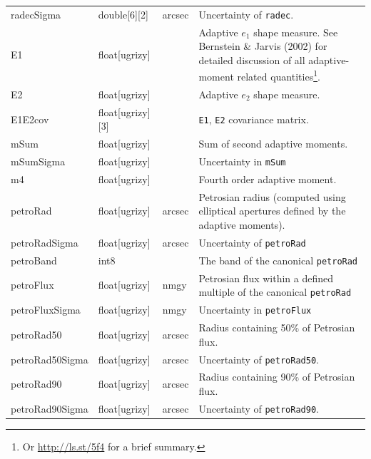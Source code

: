 \documentclass[12pt]{article}
\begin{document}
\begin{center}
\begin{longtable}{p{3cm}p{2cm}p{2cm}p{5cm}}
radecSigma & double[6][2] & arcsec & Uncertainty of {\tt radec}. \\


E1 & float[ugrizy] & ~ & Adaptive $e_1$ shape measure. See Bernstein \& Jarvis (2002) for detailed discussion of all adaptive-moment related quantities\footnote{Or \url{http://ls.st/5f4} for a brief summary.}. \\

E2 & float[ugrizy] & ~ & Adaptive $e_2$ shape measure. \\

E1E2cov & float[ugrizy][3] & ~ & {\tt E1}, {\tt E2} covariance matrix. \\

mSum & float[ugrizy] & ~ & Sum of second adaptive moments. \\

mSumSigma & float[ugrizy] & ~ & Uncertainty in {\tt mSum} \\

m4 & float[ugrizy] & ~ & Fourth order adaptive moment. \\


petroRad & float[ugrizy] & arcsec & Petrosian radius (computed using elliptical apertures defined by the adaptive moments). \\

petroRadSigma & float[ugrizy] & arcsec & Uncertainty of {\tt petroRad} \\

petroBand & int8 & ~ & The band of the canonical {\tt petroRad} \\

petroFlux & float[ugrizy] & nmgy & Petrosian flux within a defined multiple of the canonical {\tt petroRad} \\

petroFluxSigma & float[ugrizy] & nmgy & Uncertainty in {\tt petroFlux} \\

petroRad50 & float[ugrizy] & arcsec & Radius containing 50\% of Petrosian flux. \\

petroRad50Sigma & float[ugrizy] & arcsec & Uncertainty of {\tt petroRad50}. \\

petroRad90 & float[ugrizy] & arcsec & Radius containing 90\% of Petrosian flux. \\

petroRad90Sigma & float[ugrizy] & arcsec & Uncertainty of {\tt petroRad90}. \\



\end{longtable}
\end{center}
\end{document}
